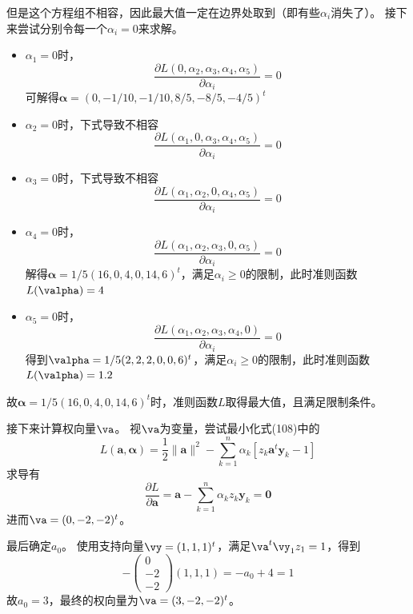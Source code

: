 \documentclass[reportComp]{thesis}
\begin{document}
\begin{answer}[\textsection 5 Q32]
\begin{itemize}
	但是这个方程组不相容，因此最大值一定在边界处取到（即有些$\alpha_i$消失了）。
	接下来尝试分别令每一个$\alpha_i=0$来求解。
	\begin{itemize}
	\item $\alpha_1=0$时，
	\[\frac{\partial L\left(0, \alpha_{2}, \alpha_{3}, \alpha_{4}, \alpha_{5}\right)}{\partial \alpha_{i}}=0\]
	可解得$\boldsymbol{\alpha}=(0,-1/10,-1/10,8/5,-8/5,-4/5)^{t}$
	\item $\alpha_2=0$时，下式导致不相容
	\[\frac{\partial L\left(\alpha_{1}, 0, \alpha_{3}, \alpha_{4}, \alpha_{5}\right)}{\partial \alpha_{i}}=0\]
	\item $\alpha_3=0$时，下式导致不相容
	\[\frac{\partial L\left(\alpha_{1}, \alpha_{2}, 0, \alpha_{4}, \alpha_{5}\right)}{\partial \alpha_{i}}=0\]
	\item $\alpha_4=0$时，
	\[\frac{\partial L\left(\alpha_{1}, \alpha_{2}, \alpha_{3}, 0, \alpha_{5}\right)}{\partial \alpha_{i}}=0\]
	解得$\boldsymbol{\alpha}=1/5(16,0,4,0,14,6)^{t}$，满足$\alpha_i\geq 0$的限制，此时准则函数$L(\valpha)=4$
	\item $\alpha_5=0$时，
	\[\frac{\partial L\left(\alpha_{1}, \alpha_{2}, \alpha_{3}, \alpha_{4}, 0\right)}{\partial \alpha_{i}}=0\]
	得到$\valpha=1 / 5(2,2,2,0,0,6)^{t}$，满足$\alpha_i\geq 0$的限制，此时准则函数$L(\valpha)=1.2$
	\end{itemize}
	故$\boldsymbol{\alpha}=1/5(16,0,4,0,14,6)^{t}$时，准则函数$L$取得最大值，且满足限制条件。

	接下来计算权向量$\va$。
	视$\va$为变量，尝试最小化式(108)中的
	\[L(\mathbf{a}, \boldsymbol{\alpha})=\frac{1}{2}\|\mathbf{a}\|^{2}-\sum_{k=1}^{n} \alpha_{k}\left[z_{k} \mathbf{a}^{t} \mathbf{y}_{k}-1\right]\]
	求导有
	\[\frac{\partial L}{\partial \mathbf{a}}=\mathbf{a}-\sum_{k=1}^{n} \alpha_{k} z_{k} \mathbf{y}_{k}=\mathbf{0}\]
	进而$\va=(0,-2,-2)^t$。

	最后确定$a_0$。
	使用支持向量$\vy=(1,1,1)^t$，满足$\va^t\vy_1z_1=1$，得到
	\[-\left(\begin{array}{c}{0} \\ {-2} \\ {-2}\end{array}\right)(1,1,1)=-a_{0}+4=1\]
	故$a_0=3$，最终的权向量为$\va=(3,-2,-2)^t$。
\end{itemize}
\end{answer}
\end{document}
